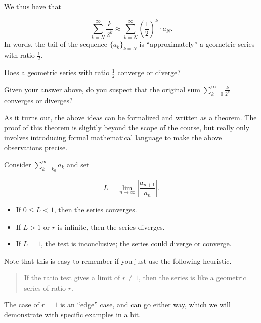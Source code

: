 \documentclass{ximera}
\begin{document}
\begin{exploration}
We thus have that 

\[
\sum_{k=N}^{\infty}  \frac{k}{2^k} \approx \sum_{k=N}^{\infty} \left(\frac{1}{2}\right)^k \cdot a_N.
\]
In words, the tail of the sequence $\{a_k\}_{k=N}$ is ``approximately'' a geometric series with ratio $\frac{1}{2}$.

\begin{question}
Does a geometric series with ratio $\frac{1}{2}$ converge or diverge?
\begin{prompt}
  \begin{multipleChoice}
  \end{multipleChoice}
\end{prompt}
\begin{question}
  Given your answer above, do you suspect that the original sum
  $\sum_{k=0}^\infty \frac{k}{2^k}$ converges or diverges?
  \begin{prompt}
    \begin{multipleChoice}
    \end{multipleChoice}
  \end{prompt}
\end{question}
\end{question}
\end{exploration}

As it turns out, the above ideas can be formalized and written as a theorem.  The proof of
this theorem is slightly beyond the scope of the course, but really only involves introducing formal mathematical language to make the above observations precise.

\begin{theorem}
Consider $\sum_{k=k_0}^\infty a_k$ and set 

\[
L = \lim_{n \to \infty} \left| \frac{a_{n+1}}{a_n} \right|. 
\]

\begin{itemize}
  \item If $0 \leq L < 1$, then the series converges.
  \item If $L>1$ or $r$ is infinite, then the series diverges.
  \item If $L = 1$, the test is inconclusive; the series could diverge or converge.
  \end{itemize}
\end{theorem}

Note that this is easy to remember if you just use the following heuristic.
\begin{quote}
  If the ratio test gives a limit of $r \neq 1 $, then the series is like a
  geometric series of ratio $r$.
\end{quote}
The case of $r=1$ is an ``edge'' case, and can go either way, which we will demonstrate with specific examples in a bit.
\end{document}
